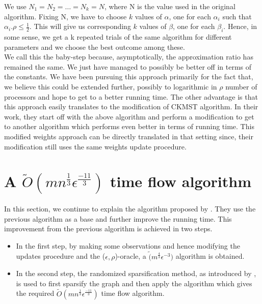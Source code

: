 \documentclass[BTech]{iitmdiss}
\begin{document}
	    We use $N_1 = N_2 = \ldots = N_k = N$, where N is the value used in the original algorithm. Fixing N, we have to choose 
	    $k$ values of $\alpha$, one for each $\alpha_i$ such that $\alpha_i.\rho \leq \frac{1}{2}$. This will give us corresponding $k$ values of 
	    $\beta$, one for each $\beta_i$. Hence, in some sense, we get a k repeated trials of the same algorithm for different parameters and 
	    we choose the best outcome among these. \\
	    
	    We call this the baby-step because, asymptotically, the approximation ratio has remained the same. We just have managed to possibly be 
	    better off in terms of the constants. We have been pursuing this approach primarily for the fact that, we believe this could be extended
	    further, possibly to logarithmic in $\rho$ number of processors and hope to get to a better running time. The other advantage is that 
	    this approach easily translates to the modification of CKMST algorithm. In their work, they start off with the above algorithm and perform a modification
	    to get to another algorithm which performs even better in terms of running time. This modified weights approach can be directly translated in that 
	    setting since, their modification still uses the same weights update procedure.

	    
	    \section{A $\widetilde{O}(m n^{\frac{1}{3}}\epsilon^{\frac{-11}{3}})$ time flow algorithm}
	      In this section, we continue to explain the algorithm proposed by \cite{DBLP:journals/corr/abs-1010-2921}. They use the previous algorithm as a base and further improve 
	      the running time. This improvement from the previous algorithm is achieved in two steps.
	      \begin{itemize}
	       \item 
		In the first step, by making some observations and hence modifying the updates procedure and the ($\epsilon, \rho$)-oracle, a
		$\widetilde(m^{\frac{4}{3}}\epsilon^{-3})$ algorithm is obtained.
	      \item
		 In the second step, the randomized sparsification method, as introduced by \cite{Benczur:1996:ASM:237814.237827}, is used to first 
		 sparsify the graph and then apply the algorithm which gives the required $\widetilde{O}(m n^{\frac{1}{3}}\epsilon^{\frac{-11}{3}})$
		 time flow algorithm.
	      \end{itemize}
	      
\end{document}
